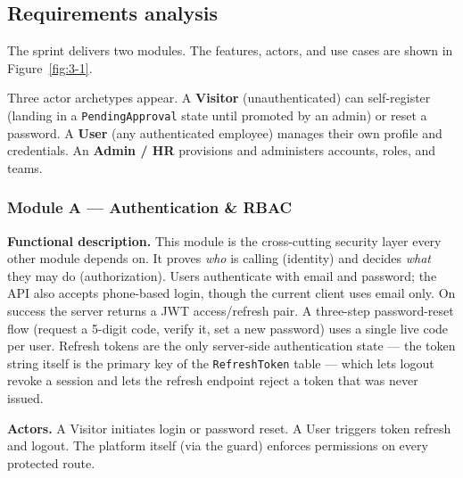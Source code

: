 \subsection{Requirements analysis}

The sprint delivers two modules. The features, actors, and use cases are shown in
Figure~\ref{fig:3-1}.

{\renewcommand{\figmaxheight}{0.75\textheight}%
}

Three actor archetypes appear. A \textbf{Visitor} (unauthenticated) can self-register (landing in a
\texttt{PendingApproval} state until promoted by an admin) or reset a password. A \textbf{User} (any
authenticated employee) manages their own profile and credentials. An \textbf{Admin / HR} provisions
and administers accounts, roles, and teams.

\subsubsection{Module A --- Authentication \& RBAC}

\textbf{Functional description.} This module is the cross-cutting security layer every other
module depends on. It proves \emph{who} is calling (identity) and decides \emph{what} they may
do (authorization). Users authenticate with email and password; the API also accepts phone-based
login, though the current client uses email only. On success the server returns a JWT
access/refresh pair. A three-step password-reset flow (request a 5-digit
code, verify it, set a new password) uses a single live code per user. Refresh tokens are the
only server-side authentication state --- the token string itself is the primary key of the
\texttt{RefreshToken} table --- which lets logout revoke a session and lets the refresh endpoint
reject a token that was never issued.

\textbf{Actors.} A Visitor initiates login or password reset. A User triggers token refresh and
logout. The platform itself (via the guard) enforces permissions on every protected route.

